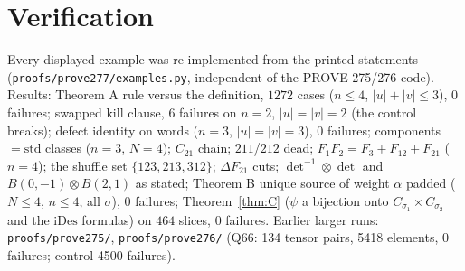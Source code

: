 \documentclass[11pt]{amsart}
\theoremstyle{definition}
\theoremstyle{remark}
\newcommand{\std}{\mathrm{std}}
\newcommand{\iDes}{\mathrm{iDes}}
\begin{document}
\section{Verification}
Every displayed example was re-implemented from the printed statements (\texttt{proofs/prove277/examples.py}, independent of the PROVE 275/276 code). Results: Theorem A rule versus the definition, $1272$ cases ($n\le4$, $|u|+|v|\le3$), $0$ failures; swapped kill clause, $6$ failures on $n=2$, $|u|=|v|=2$ (the control breaks); defect identity on words ($n=3$, $|u|=|v|=3$), $0$ failures; components $=\std$ classes ($n=3$, $N=4$); $C_{21}$ chain; $211$/$212$ dead; $F_1F_2=F_3+F_{12}+F_{21}$ ($n=4$); the shuffle set $\{123,213,312\}$; $\Delta F_{21}$ cuts; $\det^{-1}\otimes\det$ and $B(0,-1)\otimes B(2,1)$ as stated; Theorem B unique source of weight $\alpha$ padded ($N\le4$, $n\le4$, all $\sigma$), $0$ failures; Theorem~\ref{thm:C} ($\psi$ a bijection onto $C_{\sigma_1}\times C_{\sigma_2}$ and the $\iDes$ formulas) on $464$ slices, $0$ failures. Earlier larger runs: \texttt{proofs/prove275/}, \texttt{proofs/prove276/} (Q66: 134 tensor pairs, 5418 elements, 0 failures; control 4500 failures).
\end{document}
